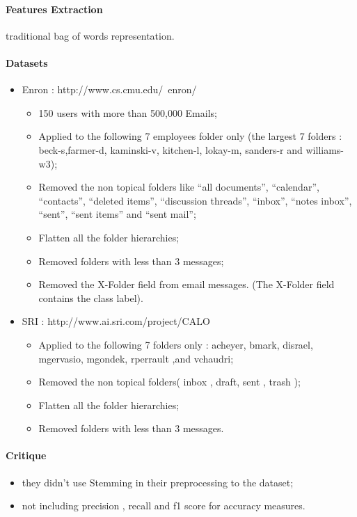 \documentclass[12pt]{article}
\begin{document}
\paragraph{Features Extraction}
traditional bag of words representation.

\paragraph{Datasets}
    \begin{itemize}
    \item Enron : http://www.cs.cmu.edu/~enron/
    \begin{itemize}
        \item 150 users with more than 500,000 Emails;
        \item Applied to the following 7 employees folder only 
	      (the largest 7 folders : beck-s,farmer-d, kaminski-v, 
	      kitchen-l, lokay-m, sanders-r and williams-w3);
        \item Removed the non topical folders like ``all documents'', 
	      ``calendar'', ``contacts'', ``deleted items'', ``discussion threads'', 
	      ``inbox'', ``notes inbox'', ``sent'', ``sent items'' and ``sent mail'';
        \item Flatten all the folder hierarchies;
        \item Removed folders with less than 3 messages;
        \item Removed the X-Folder field from email messages. (The X-Folder 
	      field contains the class label).
    \end{itemize}
    \item SRI : http://www.ai.sri.com/project/CALO
    \begin{itemize}
        \item Applied to the following 7 folders only : acheyer, bmark, disrael, 
	      mgervasio, mgondek, rperrault ,and vchaudri;
        \item Removed the non topical folders( inbox , draft, sent , trash );
        \item Flatten all the folder hierarchies;
        \item Removed folders with less than 3 messages.
    \end{itemize}
\end{itemize}

\paragraph{Critique}
\begin{itemize}
    \item they didn’t use Stemming in their preprocessing to the dataset;
    \item not including precision , recall and f1 score for accuracy measures.
\end{itemize}
\end{document}
